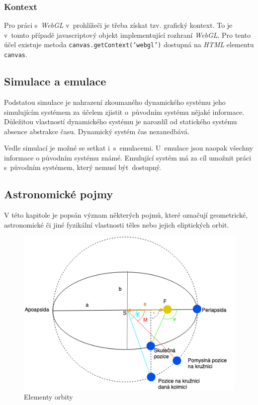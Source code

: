 \documentclass[a4paper,12pt]{article}
\def\code#1{\texttt{#1}}
\begin{document}
\subsubsection{Kontext}

Pro práci s~\textit{WebGL} v~prohlížeči je třeba získat tzv. grafický kontext. To je v~tomto případě javascriptový objekt implementující rozhraní \textit{WebGL}. Pro tento účel existuje metoda \code{canvas.getContext('webgl')} dostupná na \textit{HTML} elementu \code{canvas}.~\cite{graphic}

\subsection{Simulace a emulace}

Podstatou simulace je nahrazení zkoumaného dynamického systému jeho simulujícím systémem za účelem zjistit o~původním systému nějaké informace. Důležitou vlastností dynamického systému je narozdíl od statického systému absence abstrakce času. Dynamický systém čas nezanedbává.~\cite{simulations} 

Vedle simulací je možné se setkat i~s~emulacemi. U~emulace jsou naopak všechny informace o původním systému známé. Emulující systém má za cíl umožnit práci s~původním systémem, který nemusí být~dostupný.~\cite{emulations}

\subsection{Astronomické pojmy}

V této kapitole je popsán význam některých pojmů, které označují geometrické, astronomické či jiné fyzikální vlastnosti těles nebo jejich eliptických orbit.

\begin{figure}[H]
\begin{center}
\includegraphics[width=350pt]{Images/Orbit.png}
\caption[Elementy orbity]{Elementy orbity \footnotemark}
\end{center}
\end{figure}
\end{document}
